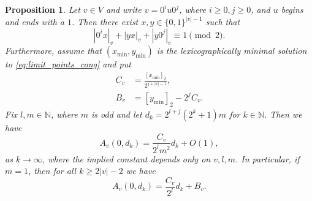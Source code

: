 \documentclass[a4paper,11pt]{amsart}
\newtheorem{prop}[thm]{Proposition}
\theoremstyle{definition}
\newcommand{\N}{\mathbb{N}}
\begin{document}
\begin{prop} \label{prop:limit_points}
Let $v  \in V$ and write $v = 0^i u 0^j$, where $i \geq 0, j \geq 0$, and $u$ begins and ends with a $1$. Then there exist $x,y \in \{0,1\}^{|v|-1}$ such that 
\begin{equation} \label{eq:limit_points_cong}
|0^i x|_{v} + |yx|_{v} + |y 0^j|_{v} \equiv 1 \pmod{2}.
\end{equation}
Furthermore, assume that $(x_{\min},y_{\min})$ is the lexicographically minimal solution to \eqref{eq:limit_points_cong} and put
\begin{align*}
 C_v &= \frac{[x_{\min}]_2}{2^{j+|v|-1}}, \\
 B_v &= [y_{\min}]_2 - 2^j C_v.
 \end{align*}
Fix $l,m \in \N$, where $m$ is odd and let $d_k = 2^{l+j}(2^k+1)m$ for $k \in \N$. Then we have
$$ A_v(0,d_k)  = \frac{C_v}{2^l m^2}d_k + O(1), $$
as $k \to \infty$, where the implied constant depends only on $v,l,m$.
In particular, if $m=1$, then for all $k \geq 2|v|-2$ we have
$$ A_v(0,d_k) = \frac{C_v}{2^l} d_k + B_v.$$
\end{prop}
\end{document}

